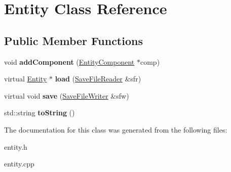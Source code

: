 \hypertarget{class_entity}{}\section{Entity Class Reference}
\label{class_entity}
\subsection*{Public Member Functions}
\begin{DoxyCompactItemize}
\item 
\mbox{\label{class_entity_a0729633dfb5e5bafbc90344ebf8084e1}} 
void {\bfseries add\+Component} (\hyperlink{class_entity_component}{Entity\+Component} $\ast$comp)
\item 
\mbox{\label{class_entity_a2b6176cc5cbdcbcf50c3e504b2d2cf1e}} 
virtual \hyperlink{class_entity}{Entity} $\ast$ {\bfseries load} (\hyperlink{class_save_file_reader}{Save\+File\+Reader} \&sfr)
\item 
\mbox{\label{class_entity_a50c4e0080827d7fc42d40dc183eb7226}} 
virtual void {\bfseries save} (\hyperlink{class_save_file_writer}{Save\+File\+Writer} \&sfw)
\item 
\mbox{\label{class_entity_a2d2e82ce6acc0a4c718e29563fe6cfb9}} 
std\+::string {\bfseries to\+String} ()
\end{DoxyCompactItemize}


The documentation for this class was generated from the following files\+:\begin{DoxyCompactItemize}
\item 
entity.\+h\item 
entity.\+cpp\end{DoxyCompactItemize}
